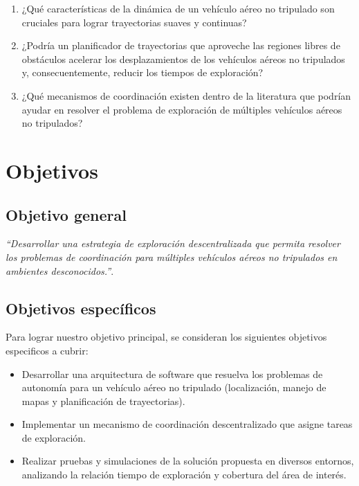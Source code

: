 \begin{enumerate}\setlength{\itemsep}{-1mm}
\item ¿Qué características de la dinámica de un vehículo aéreo no tripulado son cruciales para lograr trayectorias suaves y continuas?
\item ¿Podría un planificador de trayectorias que aproveche las regiones libres de obstáculos acelerar los desplazamientos de los vehículos aéreos no tripulados y, consecuentemente, reducir los tiempos de exploración?
\item ¿Qué mecanismos de coordinación existen dentro de la literatura que podrían ayudar en resolver el problema de exploración de múltiples vehículos aéreos no tripulados?
\end{enumerate}

\section{Objetivos}

\subsection*{Objetivo general}

\emph{``Desarrollar una estrategia de exploración descentralizada que permita resolver los problemas de coordinación para múltiples vehículos aéreos no tripulados en ambientes desconocidos.''}.

\subsection*{Objetivos específicos}

Para lograr nuestro objetivo principal, se consideran los siguientes objetivos especificos a cubrir:

\begin{itemize}\setlength{\itemsep}{-1mm}
\item Desarrollar una arquitectura de software que resuelva los problemas de autonomía para un vehículo aéreo no tripulado (localización, manejo de mapas y planificación de trayectorias).
\item Implementar un mecanismo de coordinación descentralizado que asigne tareas de exploración.
\item Realizar pruebas y simulaciones de la solución propuesta en diversos entornos, analizando la relación tiempo de exploración y cobertura del área de interés.
\end{itemize}

